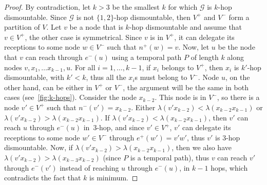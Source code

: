 \documentclass[USenglish, a4paper, thm-restate,numberwithinsect, cleveref]{lipics-v2021}
\newcommand{\G}{\ensuremath{\mathcal{G}}\xspace}
\begin{document}
\begin{proof}
  By contradiction, let $k> 3$ be the smallest $k$ for which $\G$ is $k$-hop dismountable.
  Since $\G$ is not $\{1,2\}$-hop dismountable, then $V^+$ and $V^-$ form a partition of $V$. Let $v$ be a node that is $k$-hop dismountable
  and assume that $v\in V^+$, the other case is symmetrical. Since $v$ is in $V^+$, it can delegate its receptions to some node $w\in V^-$ such that $n^+(w)=v$.
  Now, let $u$ be the node that $v$ can reach through $e^-(u)$ using a temporal path $P$ of length $k$ along nodes $v,x_1,\dots x_{k-1},u$.
  For all $i=1,\dots ,k-1$, if $x_i$ belongs to $V^+$, then $x_i$ is $k'$-hop dismountable, with $k'<k$, thus all the $x_i$s must belong to $V^-$.
  Node $u$, on the other hand, can be either in $V^+$ or $V^-$, the argument will be the same in both cases (see~\cref{fig:k-hops}).
  Consider the node $x_{k-2}$. This node is in $V^-$, so there is a node $v'\in V^+$ such that $n^-(v')=x_{k-2}$.
  Either $\lambda(v'x_{k-2}) < \lambda(x_{k-2}x_{k-1})$ or $\lambda(v'x_{k-2}) > \lambda(x_{k-2}x_{k-1})$.
  If $\lambda(v'x_{k-2}) < \lambda(x_{k-2}x_{k-1})$, then $v'$ can reach $u$ through $e^-(u)$ in~$3$-hop,
  and since $v'\in V^+$, $v'$ can delegate its receptions to some node $w'\in V^-$ through $e^+(w')=v'w'$, thus $v'$ is $3$-hop dismountable.
  Now, if $\lambda(v'x_{k-2}) > \lambda(x_{k-2}x_{k-1})$, then we also have $\lambda(v'x_{k-2}) > \lambda(x_{k-3}x_{k-2})$
  (since $P$ is a temporal path), thus $v$ can reach $v'$ through $e^-(v')$ instead of reaching $u$ through $e^-(u)$,
  in $k-1$ hops, which contradicts the fact that $k$ is minimum.
\end{proof}
\end{document}
